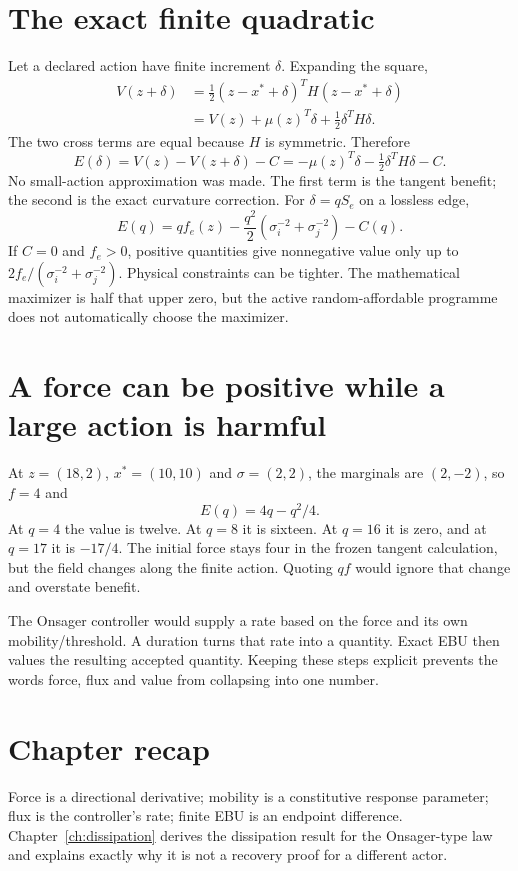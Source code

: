 \section{The exact finite quadratic}
Let a declared action have finite increment $\delta$. Expanding the square,
\begin{align}
 V(z+\delta)
 &=\tfrac12(z-x^*+\delta)^TH(z-x^*+\delta)\\
 &=V(z)+\mu(z)^T\delta+\tfrac12\delta^TH\delta.
\end{align}
The two cross terms are equal because $H$ is symmetric. Therefore
\begin{equation}\label{eq:finite}
 E(\delta)=V(z)-V(z+\delta)-C
 =-\mu(z)^T\delta-\tfrac12\delta^TH\delta-C.
\end{equation}
No small-action approximation was made. The first term is the tangent
benefit; the second is the exact curvature correction. For $\delta=qS_e$
on a lossless edge,
\begin{equation}\label{eq:edgefinite}
 E(q)=qf_e(z)-\frac{q^2}{2}
       \left(\sigma_i^{-2}+\sigma_j^{-2}\right)-C(q).
\end{equation}
If $C=0$ and $f_e>0$, positive quantities give nonnegative value only up
to $2f_e/(\sigma_i^{-2}+\sigma_j^{-2})$. Physical constraints can be
tighter. The mathematical maximizer is half that upper zero, but the active
random-affordable programme does not automatically choose the maximizer.

\section{A force can be positive while a large action is harmful}
At $z=(18,2)$, $x^*=(10,10)$ and $\sigma=(2,2)$, the marginals are
$(2,-2)$, so $f=4$ and
\begin{equation}
 E(q)=4q-q^2/4.
\end{equation}
At $q=4$ the value is twelve. At $q=8$ it is sixteen. At $q=16$ it is
zero, and at $q=17$ it is $-17/4$. The initial force stays four in the
frozen tangent calculation, but the field changes along the finite action.
Quoting $qf$ would ignore that change and overstate benefit.

The Onsager controller would supply a rate based on the force and its own
mobility/threshold. A duration turns that rate into a quantity. Exact EBU
then values the resulting accepted quantity. Keeping these steps explicit
prevents the words force, flux and value from collapsing into one number.

\section*{Chapter recap}
Force is a directional derivative; mobility is a constitutive response
parameter; flux is the controller's rate; finite EBU is an endpoint
difference. Chapter~\ref{ch:dissipation} derives the dissipation result for the Onsager-type
law and explains exactly why it is not a recovery proof for a different actor.
